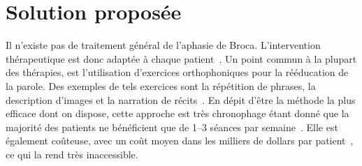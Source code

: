 \section{Solution proposée}

Il n'existe pas de traitement général de l'aphasie de Broca.
L'intervention thérapeutique est donc adaptée à chaque patient~\cite{Acharya_Wroten_2022}.
Un point commun à la plupart des thérapies, 
est l'utilisation d'exercices orthophoniques pour la rééducation de la parole.
Des exemples de tels exercices sont 
la répétition de phrases, la description d'images et la narration de récits~\cite{recover}.
En dépit d'être la méthode la plus efficace dont on dispose,
cette approche est très chronophage étant donné que 
la majorité des patients ne bénéficient que de 1--3 séances par semaine~\cite{recover}.
Elle est également coûteuse, 
avec un coût moyen dans les milliers de dollars par patient~\cite{Liu_Huang_Xu_Wu_Tao_Chen_2021,Jacobs_Ellis_2021},
ce qui la rend très inaccessible.
